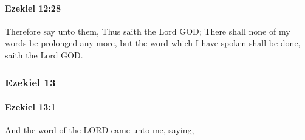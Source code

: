 		\paragraph{Ezekiel 12:28} %
			\label{EZEKIEL-12-28}

			Therefore say unto them, Thus saith the Lord GOD; There shall none of my words be prolonged any more, but the word which I have spoken shall be done, saith the Lord GOD.

	\subsubsection{Ezekiel 13} %
		\label{EZEKIEL-13}

		\paragraph{Ezekiel 13:1} %
			\label{EZEKIEL-13-1}

			And the word of the LORD came unto me, saying,


